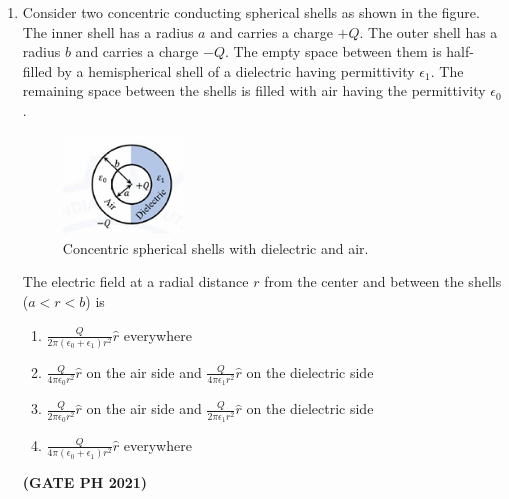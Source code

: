 \documentclass[14pt, a4paper]{extarticle}
\begin{document}
\begin{enumerate}[label=\textbf{Q.\arabic*}]
\begin{enumerate}[label=\textbf{Q.\arabic*}]
\item Consider two concentric conducting spherical shells as shown in the figure. The inner shell has a radius $a$ and carries a charge $+Q$. The outer shell has a radius $b$ and carries a charge $-Q$. The empty space between them is half-filled by a hemispherical shell of a dielectric having permittivity $\epsilon_1$. The remaining space between the shells is filled with air having the permittivity $\epsilon_0$.
\begin{figure}[H]
\centering
\includegraphics[width=0.3\textwidth]{figs/q41fig21.png}
\caption{Concentric spherical shells with dielectric and air.}
\label{fig:q31ph}
\end{figure}
The electric field at a radial distance $r$ from the center and between the shells ($a < r < b$) is
\begin{enumerate}
\item $\frac{Q}{2\pi(\epsilon_0+\epsilon_1)r^2}\hat{r}$ everywhere
\item $\frac{Q}{4\pi\epsilon_0 r^2}\hat{r}$ on the air side and $\frac{Q}{4\pi\epsilon_1 r^2}\hat{r}$ on the dielectric side
\item $\frac{Q}{2\pi\epsilon_0 r^2}\hat{r}$ on the air side and $\frac{Q}{2\pi\epsilon_1 r^2}\hat{r}$ on the dielectric side
\item $\frac{Q}{4\pi(\epsilon_0+\epsilon_1)r^2}\hat{r}$ everywhere
\end{enumerate}
\hfill \textbf{(GATE PH 2021)}


\end{enumerate}
\end{enumerate}
\end{document}
